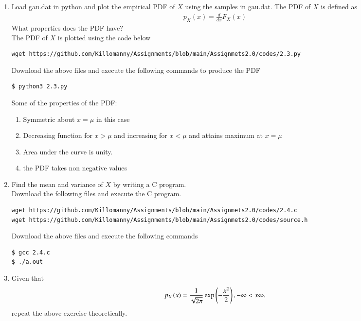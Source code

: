 \documentclass[journal,12pt,twocolumn]{IEEEtran}
\renewcommand\thesection{\arabic{section}}
\begin{document}
\begin{enumerate}[label=\thesection.\arabic*
,ref=\thesection.\theenumi]
\begin{enumerate}
    \item Symmetric about one point.
\end{enumerate}
\item
Load gau.dat in python and plot the empirical PDF of $X$ using the samples in gau.dat. The PDF of $X$ is defined as
\begin{align}
p_{X}(x) = \frac{d}{dx}F_{X}(x)
\end{align}
What properties does the PDF have?
\\
\solution The PDF of $X$ is plotted using the code below
\begin{lstlisting}
wget https://github.com/Killomanny/Assignments/blob/main/Assignmets2.0/codes/2.3.py
\end{lstlisting}
Download the above files and execute the following commands to produce the PDF
\begin{lstlisting}
$ python3 2.3.py
\end{lstlisting}
Some of the properties of the PDF:
\begin{enumerate}
    \item Symmetric about $x=\mu$ in this case
    \item Decreasing function for $x>\mu$ and increasing for $x<\mu$ and attains maximum at $x=\mu$
    \item Area under the curve is unity.
    \item the PDF takes non negative values
\end{enumerate}
\item Find the mean and variance of $X$ by writing a C program.\\
\solution Download the following files and execute the  C program.
\begin{lstlisting}
wget https://github.com/Killomanny/Assignments/blob/main/Assignmets2.0/codes/2.4.c
wget https://github.com/Killomanny/Assignments/blob/main/Assignmets2.0/codes/source.h
\end{lstlisting}
Download the above files and execute the following commands
\begin{lstlisting}
$ gcc 2.4.c
$ ./a.out
\end{lstlisting}
\item Given that 
\begin{align}
p_{X}\left(x\right) = \frac{1}{\sqrt{2\pi}}\exp\left(-\frac{x^2}{2}\right), -\infty < x \infty,
\end{align}
repeat the above exercise theoretically.\\
\solution\\

\end{enumerate}
\end{document}
